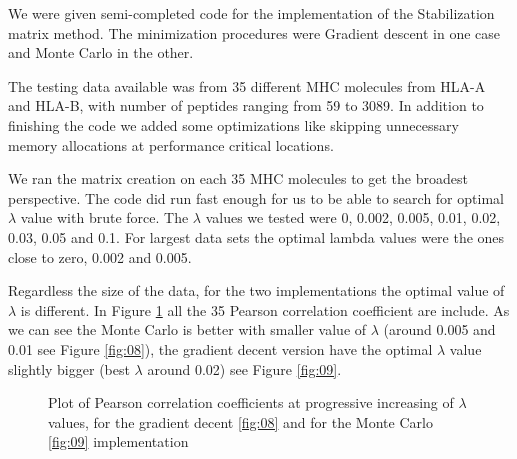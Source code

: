 \documentclass{bioinfo}
\begin{document}
\begin{application}
We were given semi-completed code for the implementation of the Stabilization matrix method. The minimization procedures were Gradient descent in one case and Monte Carlo in the other. 
\par The testing data available was from 35 different MHC molecules from HLA-A and HLA-B, with number of peptides ranging from 59 to 3089. In addition to finishing the code we added some optimizations like skipping unnecessary memory allocations at performance critical locations.
\par We ran the matrix creation on each 35 MHC molecules to get the broadest perspective. The code did run fast enough for us to be able to search for optimal $\lambda$ value with brute force. The $\lambda$ values we tested were 0, 0.002, 0.005, 0.01, 0.02, 0.03, 0.05 and 0.1. For largest data sets the optimal lambda values were the ones close to zero, 0.002 and 0.005.
\par Regardless the size of the data, for the two implementations the optimal value of $\lambda$ is different. In Figure \ref{fig:07} all the 35 Pearson correlation coefficient are include. As we can see the Monte Carlo is better with smaller value of $\lambda$ (around 0.005 and 0.01  see Figure \ref{fig:08}), the gradient decent version have the optimal $\lambda$ value slightly bigger (best $\lambda$ around 0.02) see Figure \ref{fig:09}.



\begin{figure}[!tpb]
\begin{center}
\end{center}
\caption{Plot of Pearson correlation coefficients at progressive increasing of $\lambda$ values, for the gradient decent \ref{fig:08} and for the Monte Carlo \ref{fig:09} implementation}
\label{fig:07}
\end{figure}


\end{application}
\end{document}
